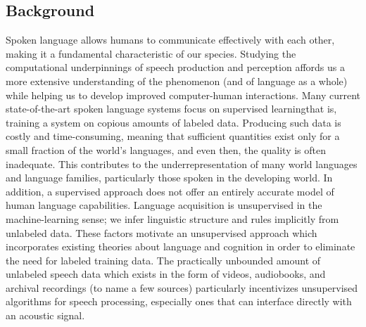 \documentclass[12pt,letterpaper]{article}
\begin{document}
\subsection{Background}
Spoken language allows humans to communicate effectively with each other, making it a fundamental characteristic of our species. Studying the computational underpinnings of speech production and perception affords us a more extensive understanding of the phenomenon (and of language as a whole) while helping us to develop improved computer-human interactions. Many current state-of-the-art spoken language systems focus on supervised learning\textemdash that is, training a system on copious amounts of labeled data. Producing such data is costly and time-consuming, meaning that sufficient quantities exist only for a small fraction of the world's languages, and even then, the quality is often inadequate. This contributes to the underrepresentation of many world languages and language families, particularly those spoken in the developing world. In addition, a supervised approach does not offer an entirely accurate model of human language capabilities. Language acquisition is unsupervised in the machine-learning sense; we infer linguistic structure and rules implicitly from unlabeled data. These factors motivate an unsupervised approach which incorporates existing theories about language and cognition in order to eliminate the need for labeled training data. The practically unbounded amount of unlabeled speech data which exists in the form of videos, audiobooks, and archival recordings (to name a few sources) particularly incentivizes unsupervised algorithms for speech processing, especially ones that can interface directly with an acoustic signal.  
\end{document}
